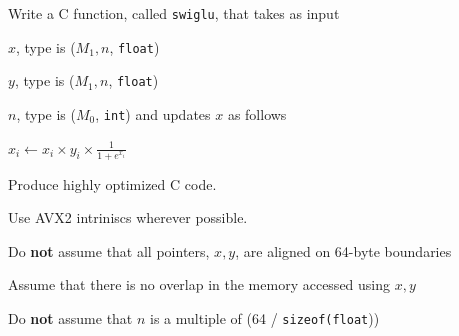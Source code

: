 \documentclass[letterpaper,12pt]{article}
\begin{document}



Write a C function, called {\tt swiglu}, that takes as input
\be
\item \(x\), type is (\(M_1, n\), {\tt float})
\item \(y\), type is (\(M_1, n\), {\tt float})
\item \(n\), type is (\(M_0\), {\tt int})
\ee
and updates \(x\) as follows
\be
\item \(x_i \leftarrow x_i \times y_i \times 
  \frac{1}{1 + e^{x_i}}\)
\ee

  \be
\item Produce highly optimized C code.
\item Use AVX2 intriniscs wherever possible.
\item Do {\bf not} assume that all pointers, \(x, y\), are aligned on 64-byte boundaries
\item Assume that there is no overlap in the memory accessed using \(x, y\)
\item Do {\bf not} assume that \(n\) is a multiple of (64 / {\tt sizeof(float}))
  \ee
\end{document}
